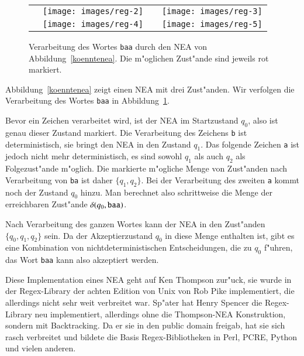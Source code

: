 \begin{figure}[H]
\begin{center}
\begin{tabular}{cccc}
&%
\texttt{[image: images/reg-2]}&
\raisebox{60pt}{$\overset{\displaystyle\text{\tt b}}\longrightarrow$}&
\texttt{[image: images/reg-3]}\\
\raisebox{60pt}{$\overset{\displaystyle\text{\tt a}}\longrightarrow$}&
\texttt{[image: images/reg-4]}&
\raisebox{60pt}{$\overset{\displaystyle\text{\tt a}}\longrightarrow$}&
\texttt{[image: images/reg-5]}
\end{tabular}
\end{center}
\caption{Verarbeitung des Wortes {\tt baa} durch den NEA von
Abbildung~\ref{koenntenea}. Die m"oglichen Zust"ande sind jeweils
rot markiert.\label{koenntebeispiel}
}
\end{figure}
Abbildung~\ref{koenntenea} zeigt einen NEA mit drei Zust"anden.
Wir verfolgen die Verarbeitung des Wortes {\tt baa} in
Abbildung~\ref{koenntebeispiel}.

Bevor ein Zeichen verarbeitet wird,
ist der NEA im Startzustand $q_0$, also ist genau dieser Zustand
markiert. Die Verarbeitung des Zeichens {\tt b} ist deterministisch,
sie bringt den NEA in den Zustand $q_1$. Das folgende Zeichen {\tt a}
ist jedoch nicht mehr deterministisch, es sind sowohl $q_1$ als auch
$q_2$ als Folgezust"ande m"oglich. Die markierte m"ogliche Menge
von Zust"anden nach Verarbeitung von {\tt ba} ist daher
$\{q_1,q_2\}$. Bei der Verarbeitung des zweiten {\tt a} kommt noch
der Zustand $q_0$ hinzu. Man berechnet also schrittweise die
Menge der erreichbaren Zust"ande $\delta(q_0,{\tt baa})$.

Nach Verarbeitung des ganzen Wortes kann der NEA in den Zust"anden
$\{q_0,q_1,q_2\}$ sein. Da der Akzeptierzustand $q_0$ in diese Menge
enthalten ist, gibt es eine Kombination von nichtdeterministischen
Entscheidungen, die zu $q_0$ f"uhren, das Wort {\tt baa} kann also
akzeptiert werden.

Diese Implementation eines NEA geht auf Ken Thompson zur"uck, sie wurde in
der Regex-Library der achten Edition von Unix von Rob Pike
 implementiert, die allerdings nicht sehr weit
verbreitet war. Sp"ater hat Henry Spencer die Regex-Library neu
implementiert, allerdings ohne die Thompson-NEA Konstruktion, sondern
mit Backtracking. Da er sie in den public domain freigab, hat sie sich
rasch verbreitet und bildete die Basis Regex-Bibliotheken in Perl, PCRE,
Python und vielen anderen.


